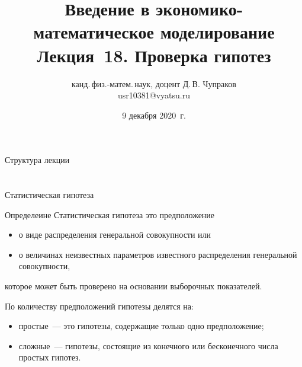 \documentclass[unicode,11pt,notheorems,xcolor=table]{beamer}
\author[Д.\,В. Чупраков]{канд.\,физ.-матем.\,наук, доцент Д.\,В. Чупраков\\[6pt] usr10381@vyatsu.ru}
\institute[ВятГУ]{ФГБОУ ВО Вятский государственный университет}
\title[Лекция~18. Проверка гипотез -- 1]{
	Введение в экономико-математическое моделирование\\[12pt]
	Лекция~18. Проверка гипотез}
\date{9 декабря 2020~г.}
\begin{document}
\maketitle

 \begin{frame}{Структура лекции}{}
 	\tableofcontents
 \end{frame}

\section{}

\begin{frame}{Статистическая гипотеза}{}

    \begin{block}{Определеине}
    \alert{Статистическая гипотеза}
    это предположение
    \begin{itemize}
        \item о виде распределения генеральной совокупности или 
        \item о величинах неизвестных параметров известного распределения генеральной совокупности,
    \end{itemize}
    которое может быть проверено на основании выборочных показателей.
    \end{block}

    По количеству предположений гипотезы делятся на:
    \begin{itemize}
        \item простые~--- это гипотезы, содержащие только одно предположение;
        \item сложные~--- гипотезы, состоящие из конечного или бесконечного числа простых гипотез.    
    \end{itemize}
\end{frame}
\end{document}
